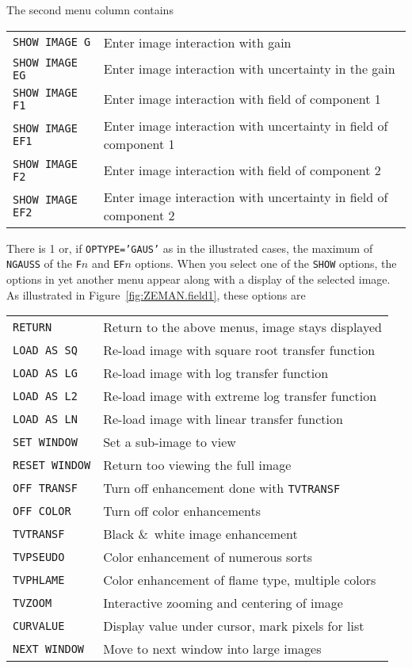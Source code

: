 \documentclass[twoside]{article}
\newcommand{\Hi}[1]{\textcolor{hicol}{#1}}
\begin{document}
The second menu column contains
\begin{center}
\begin{tabular}{|l|l|}\hline
 {\tt SHOW IMAGE G } & Enter image interaction with gain\\
 {\tt SHOW IMAGE EG } & Enter image interaction with uncertainty in
                     the gain\\
 {\tt SHOW IMAGE F1 } & Enter image interaction with field of
                     component 1\\
 {\tt SHOW IMAGE EF1} & Enter image interaction with uncertainty in
                     field of component 1\\
 {\tt SHOW IMAGE F2} & Enter image interaction with field of component
                     2\\
 {\tt SHOW IMAGE EF2} & Enter image interaction with uncertainty in
                     field of component 2\\ \hline
\end{tabular}
\end{center}
There is 1 or, if {\tt OPTYPE='GAUS'} as in the illustrated cases,
the maximum of {\tt NGAUSS} of the {\tt F}$n$ and {\tt EF}$n$ options.
When you select one of the {\tt SHOW} options, the options in yet
another menu appear along with a display of the selected image.  As
illustrated in Figure~\ref{fig:ZEMAN.field1}, these options are
\begin{center}
\begin{tabular}{|l|l|}\hline
 {\tt RETURN     } & Return to the above menus, image stays displayed\\
 {\tt LOAD AS SQ } & Re-load image with square root transfer function\\
 {\tt LOAD AS LG } & Re-load image with log transfer function\\
 {\tt LOAD AS L2 } & Re-load image with extreme log transfer function\\
 {\tt LOAD AS LN } & Re-load image with linear transfer function\\
\Hi{{\tt SET WINDOW}} & \Hi{Set a sub-image to view}\\
\Hi{{\tt RESET WINDOW}} & \Hi{Return too viewing the full image}\\
 {\tt OFF TRANSF } & Turn off enhancement done with {\tt TVTRANSF}\\
 {\tt OFF COLOR  } & Turn off color enhancements\\
 {\tt TVTRANSF   } & Black \&\ white image enhancement\\
 {\tt TVPSEUDO   } & Color enhancement of numerous sorts\\
 {\tt TVPHLAME   } & Color enhancement of flame type, multiple colors\\
 {\tt TVZOOM     } & Interactive zooming and centering of image\\
 {\tt CURVALUE   } & Display value under cursor, mark pixels for list\\
 {\tt NEXT WINDOW} & Move to next window into large images\\ \hline
\end{tabular}
\end{center}
\end{document}

